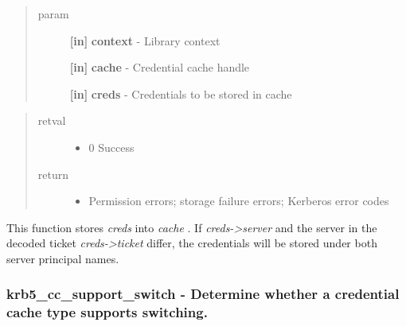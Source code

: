 \documentclass[letterpaper,10pt,english]{sphinxmanual}
\begin{document}
\begin{fulllineitems}
\label{appdev/refs/api/krb5_cc_store_cred:c.krb5_cc_store_cred}
\end{fulllineitems}

\begin{quote}\begin{description}
\item[{param}] \leavevmode
\textbf{{[}in{]}} \textbf{context} - Library context

\textbf{{[}in{]}} \textbf{cache} - Credential cache handle

\textbf{{[}in{]}} \textbf{creds} - Credentials to be stored in cache

\end{description}\end{quote}
\begin{quote}\begin{description}
\item[{retval}] \leavevmode\begin{itemize}
\item {} 
0   Success

\end{itemize}

\item[{return}] \leavevmode\begin{itemize}
\item {} 
Permission errors; storage failure errors; Kerberos error codes

\end{itemize}

\end{description}\end{quote}

This function stores \emph{creds} into \emph{cache} . If \emph{creds-\textgreater{}server} and the server in the decoded ticket \emph{creds-\textgreater{}ticket} differ, the credentials will be stored under both server principal names.


\subsubsection{krb5\_cc\_support\_switch -  Determine whether a credential cache type supports switching.}
\label{appdev/refs/api/krb5_cc_support_switch::doc}\label{appdev/refs/api/krb5_cc_support_switch:krb5-cc-support-switch-determine-whether-a-credential-cache-type-supports-switching}
\end{document}
